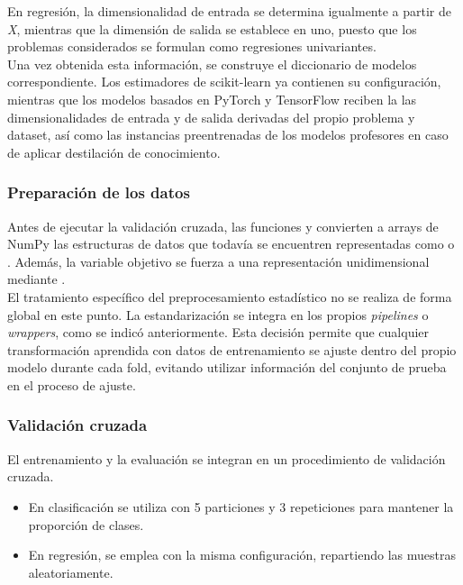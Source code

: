 \documentclass[a4paper,12pt,twoside,final]{book}
\begin{document}
En regresión, la dimensionalidad de entrada se determina igualmente a partir de \textit{X}, mientras que la dimensión
de salida se establece en uno, puesto que los problemas considerados se formulan como regresiones univariantes.\\

Una vez obtenida esta información, se construye el diccionario de modelos correspondiente. Los estimadores de
scikit-learn ya contienen su configuración, mientras que los modelos basados en PyTorch y TensorFlow reciben la
las dimensionalidades de entrada y de salida derivadas del propio problema y dataset, así como las instancias
preentrenadas de los modelos profesores en caso de aplicar destilación de conocimiento.

\subsubsection{Preparación de los datos}
Antes de ejecutar la validación cruzada, las funciones  y  convierten a
arrays de NumPy las estructuras de datos que todavía se encuentren representadas como  o .
Además, la variable objetivo se fuerza a una representación unidimensional mediante .\\

El tratamiento específico del preprocesamiento estadístico no se realiza de forma global en este punto. La
estandarización se integra en los propios \textit{pipelines} o \textit{wrappers}, como se indicó anteriormente. Esta
decisión permite que cualquier transformación aprendida con datos de entrenamiento se ajuste dentro del propio modelo
durante cada fold, evitando utilizar información del conjunto de prueba en el proceso de ajuste.

\subsubsection{Validación cruzada}
El entrenamiento y la evaluación se integran en un procedimiento de validación cruzada.
\begin{itemize}
  \item En clasificación se utiliza  con 5 particiones y 3 repeticiones para mantener la
  proporción de clases.
  \item En regresión, se emplea  con la misma configuración, repartiendo las muestras
  aleatoriamente.
\end{itemize}
\end{document}
